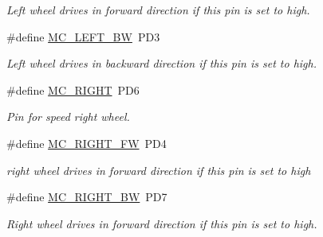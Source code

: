 \begin{DoxyCompactItemize}
\begin{DoxyCompactList}\small\item\em \-Left wheel drives in forward direction if this pin is set to high. \end{DoxyCompactList}\item 
\hypertarget{group___m_c___p_i_n_s_gaec96aeb7ac2143bd73c4e21e367f7c94}{\#define \hyperlink{group___m_c___p_i_n_s_gaec96aeb7ac2143bd73c4e21e367f7c94}{\-M\-C\-\_\-\-L\-E\-F\-T\-\_\-\-B\-W}~\-P\-D3}\label{group___m_c___p_i_n_s_gaec96aeb7ac2143bd73c4e21e367f7c94}

\begin{DoxyCompactList}\small\item\em \-Left wheel drives in backward direction if this pin is set to high. \end{DoxyCompactList}\item 
\hypertarget{group___m_c___p_i_n_s_ga17ab3ecb2a453c06a3376f54df9e9900}{\#define \hyperlink{group___m_c___p_i_n_s_ga17ab3ecb2a453c06a3376f54df9e9900}{\-M\-C\-\_\-\-R\-I\-G\-H\-T}~\-P\-D6}\label{group___m_c___p_i_n_s_ga17ab3ecb2a453c06a3376f54df9e9900}

\begin{DoxyCompactList}\small\item\em \-Pin for speed right wheel. \end{DoxyCompactList}\item 
\hypertarget{group___m_c___p_i_n_s_ga9c42700359a1bbe408fa75b3f80a4cac}{\#define \hyperlink{group___m_c___p_i_n_s_ga9c42700359a1bbe408fa75b3f80a4cac}{\-M\-C\-\_\-\-R\-I\-G\-H\-T\-\_\-\-F\-W}~\-P\-D4}\label{group___m_c___p_i_n_s_ga9c42700359a1bbe408fa75b3f80a4cac}

\begin{DoxyCompactList}\small\item\em right wheel drives in forward direction if this pin is set to high \end{DoxyCompactList}\item 
\hypertarget{group___m_c___p_i_n_s_ga14f87c4fefc3cc862fb305c19717df5a}{\#define \hyperlink{group___m_c___p_i_n_s_ga14f87c4fefc3cc862fb305c19717df5a}{\-M\-C\-\_\-\-R\-I\-G\-H\-T\-\_\-\-B\-W}~\-P\-D7}\label{group___m_c___p_i_n_s_ga14f87c4fefc3cc862fb305c19717df5a}

\begin{DoxyCompactList}\small\item\em \-Right wheel drives in forward direction if this pin is set to high. \end{DoxyCompactList}\end{DoxyCompactItemize}
